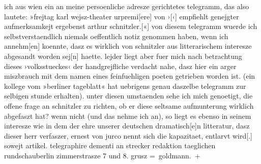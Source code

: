 \begin{ledgroupsized}[t]{13cm}
               ich aus wien ein an meine persoenliche adresze
               gerichtetes telegramm, das also lautete: »frejtag{ }karl
                  wejsz-theater urpremi{[}ere{]} von ›\label{K_L02634_1v}\label{K_L02634_1h}{[}‹{]} empfiehlt genejgter aufmerksamkejt
               ergebenst arthur schnitzler.{[}«{]} von diesem telegramm wuerde ich
               selbstverstaendlich niemals oeffentlich notiz genommen haben, wenn ich
                  annehm{[}en{]} koennte, dasz es wirklich von schnitzler aus {\pb}litterarischem interesze abgesandt worden sej{[}n{]} haette.
               lejder liegt aber fuer mich nach betrachtung dieses ›volksstueckes‹ der handgrejfliche verdacht
               nahe, dasz hier ein arger miszbrauch mit dem namen eines feinfuehligen poeten
               getrieben worden ist. (ein kollege vom »berliner
                  tageblatt« hat uebrigens genau daszelbe telegramm zur selbigen
                  stunde erhalten). unter diesen umstaenden sehe ich mich genoetigt,
               die offene frage an schnitzler zu richten, ob er diese seltsame aufmunterung wirklich
               abgefaszt hat? wenn nicht (und das nehme ich an), so liegt es ebenso in seinem
               interesze wie in dem der ehre unserer deutschen dramatisch{[}e{]}n
               litteratur, dasz dieser herr verfaszer, ernest von jurco nennt sich
               die kapazitaet, entlarvt
                  wird{[}.{]} sowejt artikel. telegraphire dementi an strecker redaktion taeglichen rundschauberlin zimmerstrasze 7 und 8. grusz \spacefill\mbox{=
                  goldmann. +}\pend
           
         
         \endnumbering{}\end{ledgroupsized}  \newcommand{\dateiname}{L02634}\newcommand{\titel}{Paul Goldmann an Arthur Schnitzler, 26. 4. 1902}\newcommand{\editorInnen}{Martin Anton Müller und Laura Untner}
      